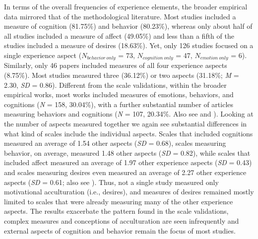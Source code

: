 In terms of the overall frequencies of experience elements, the broader
empirical data mirrored that of the methodological literature. Most
studies included a measure of cognition (81.75\%) and behavior
(80.23\%), whereas only about half of all studies included a measure of
affect (49.05\%) and less than a fifth of the studies included a measure
of desires (18.63\%). Yet, only 126 studies focused on a single
experience aspect (\(N_{behavior\ only}\) = 73, \(N_{cognition\ only}\)
= 47, \(N_{emotion\ only}\) = 6). Similarly, only 46 papers included
measures of all four experience aspects (8.75\%). Most studies measured
three (36.12\%) or two aspects (31.18\%; \textit{M} = 2.30, \textit{SD}
= 0.86). Different from the scale validations, within the broader
empirical works, most works included measures of emotions, behaviors,
and cognitions (\textit{N} = 158, 30.04\%), with a further substantial
number of articles measuring behaviors and cognitions (\textit{N} = 107,
20.34\%. Also see  and
). Looking at the number of aspects
measured together we again see substantial differences in what kind of
scales include the individual aspects. Scales that included cognitions
measured an average of 1.54 other aspects (\textit{SD} = 0.68), scales
measuring behavior, on average, measured 1.48 other aspects (\textit{SD}
= 0.82), while scales that included affect measured an average of 1.97
other experience aspects (\textit{SD} = 0.43) and scales measuring
desires even measured an average of 2.27 other experience aspects
(\textit{SD} = 0.61; also see ). Thus,
not a single study measured only motivational acculturation (i.e.,
desires), and measures of desires remained mostly limited to scales that
were already measuring many of the other experience aspects. The results
exacerbate the pattern found in the scale validations, complex measures
and conceptions of acculturation are seen infrequently and external
aspects of cognition and behavior remain the focus of most studies.

